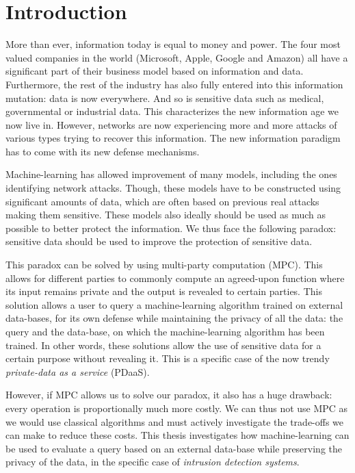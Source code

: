 \chapter{Introduction}
\label{cha:1}
More than ever, information today is equal to money and power. The four most valued companies in the world (Microsoft, Apple, Google and Amazon) all have a significant part of their business model based on information and data. Furthermore, the rest of the industry has also fully entered into this information mutation: data is now everywhere. And so is sensitive data such as medical, governmental or industrial data. This characterizes the new information age we now live in. However, networks are now experiencing more and more attacks of various types trying to recover this information. The new information paradigm has to come with its new defense mechanisms.

Machine-learning has allowed improvement of many models, including the ones identifying network attacks. Though, these models have to be constructed using significant amounts of data, which are often based on previous real attacks making them sensitive. These models also ideally should be used as much as possible to better protect the information. We thus face the following paradox: sensitive data should be used to improve the protection of sensitive data.

This paradox can be solved by using multi-party computation (MPC). This allows for different parties to commonly compute an agreed-upon function where its input remains private and the output is revealed to certain parties. This solution allows a user to query a machine-learning algorithm trained on external data-bases, for its own defense while maintaining the privacy of all the data: the query and the data-base, on which the machine-learning algorithm has been trained. In other words, these solutions allow the use of sensitive data for a certain purpose without revealing it. This is a specific case of the now trendy \emph{private-data as a service} (PDaaS).

However, if MPC allows us to solve our paradox, it also has a huge drawback: every operation is proportionally much more costly. We can thus not use MPC as we would use classical algorithms and must actively investigate the trade-offs we can make to reduce these costs. This thesis investigates how machine-learning can be used to evaluate a query based on an external data-base while preserving the privacy of the data, in the specific case of \emph{intrusion detection systems}.



